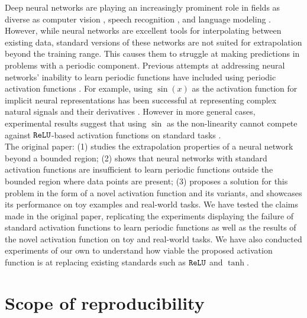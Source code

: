 Deep neural networks are playing an increasingly prominent role in fields as diverse as computer vision \cite{10.1007/978-3-030-11024-6_1}, speech recognition \cite{deng_2016}, and language modeling \cite{melis2017state}. However, while neural networks are excellent tools for interpolating between existing data, standard versions of these networks are not suited for extrapolation beyond the training range. This causes them to struggle at making predictions in problems with a periodic component. Previous attempts at addressing neural networks' inability to learn periodic functions have included using periodic activation functions \cite{fourier_one, zhumekenov2019fourier}. For example, using $\sin(x)$ as the activation function for implicit neural representations has been successful at representing complex natural signals and their derivatives \cite{sitzmann2020implicit}. However in more general cases, experimental results suggest that using $\sin$ as the non-linearity cannot compete against $ \operatorname{\texttt{ReLU}} $-based activation functions \cite{Ramachandran2017SwishAS, DBLP:conf/icml/NairH10, clevert2016fast, xu2015empirical} on standard tasks \cite{Parascandolo2017TamingTW}.\\

The original paper: (1) studies the extrapolation properties of a neural network beyond a bounded region; (2) shows that neural networks with standard activation functions are insufficient to learn periodic functions outside the bounded region where data points are present; (3) proposes a solution for this problem in the form of a novel activation function and its variants, and showcases its performance on toy examples and real-world tasks. We have tested the claims made in the original paper, replicating the experiments displaying the failure of standard activation functions to learn periodic functions as well as the results of the novel activation function on toy and real-world tasks. We have also conducted experiments of our own to understand how viable the proposed activation function is at replacing existing standards such as $\operatorname{\texttt{ReLU}}$ and $\tanh$.

\section{Scope of reproducibility}

